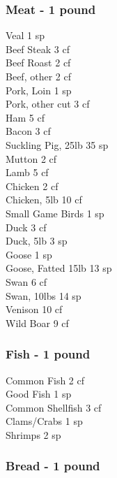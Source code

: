 \begin{multicols}{3}
{\subsubsection{Meat - 1 pound}

Veal				\hfill 1 sp \\
Beef Steak				\hfill 3 cf \\
Beef Roast				\hfill 2 cf \\
Beef, other				\hfill 2 cf \\
Pork, Loin				\hfill 1 sp \\
Pork, other cut				\hfill 3 cf \\
Ham				\hfill 5 cf \\
Bacon				\hfill 3 cf \\
Suckling Pig, 25lb				\hfill 35 sp \\
Mutton				\hfill 2 cf \\
Lamb				\hfill 5 cf \\
Chicken				\hfill 2 cf \\
Chicken, 5lb				\hfill 10 cf \\
Small Game Birds			\hfill 1 sp \\
Duck					\hfill 3 cf \\
Duck, 5lb				\hfill 3 sp \\
Goose					\hfill 1 sp \\
Goose, Fatted 15lb			\hfill 13 sp \\
Swan					\hfill 6 cf \\
Swan, 10lbs				\hfill 14 sp \\
Venison					\hfill 10 cf \\
Wild Boar				\hfill 9 cf \\


\subsubsection{Fish - 1 pound}

Common Fish				\hfill 2 cf \\
Good Fish				\hfill 1 sp \\
Common Shellfish			\hfill 3 cf \\
Clams/Crabs				\hfill 1 sp \\
Shrimps					\hfill 2 sp \\

\subsubsection{Bread - 1 pound}

}
\end{multicols}
